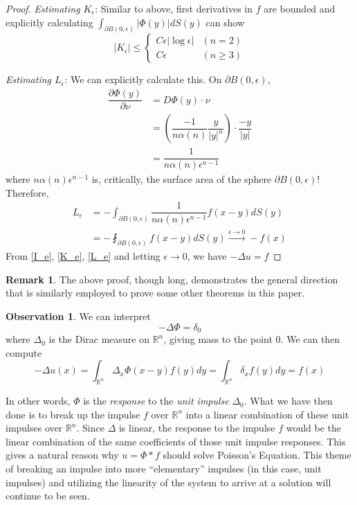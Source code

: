 \documentclass[openany, amssymb, psamsfonts]{amsart}
\theoremstyle{definition}
\newtheorem{rem}{Remark}[section]
\newtheorem{obs}{Observation}[section]
\numberwithin{equation}{section}
\newcommand{\bbr}{\mathbb{R}}
\begin{document}
\begin{proof}
\textit{Estimating $K_\epsilon$}: Similar to above, first derivatives in $f$ are bounded and explicitly calculating $\int_{\partial B(0, \epsilon)} |\Phi (y)| dS(y)$ can show \begin{equation} \label{K_e}
    |K_\epsilon| \leq \begin{cases}
        C\epsilon |\log \epsilon| & (n=2) \\
        C \epsilon & (n \geq 3)
    \end{cases}
\end{equation}

\textit{Estimating $L_\epsilon$}: We can explicitly calculate this. On $\partial B(0, \epsilon)$, \begin{align*}
    \dfrac{\partial \Phi (y)}{\partial \nu} &= D\Phi(y) \cdot \nu \\
    &= \left( \dfrac{-1}{n \alpha(n)} \dfrac{y}{|y|^n} \right) \cdot \dfrac{-y}{|y|} \\
    &= \dfrac{1}{n \alpha(n) \epsilon^{n-1}}
\end{align*}
where $n \alpha(n) \epsilon^{n-1}$ is, critically, the surface area of the sphere $\partial B(0, \epsilon)$! Therefore, 
\begin{align} 
    L_\epsilon &= - \int_{\partial B(0, \epsilon)} \dfrac{1}{n \alpha(n) \epsilon^{n-1}} f(x - y) dS(y) \nonumber \\
    &= - \fint_{\partial B(0, \epsilon)} f(x-y) dS(y) \xrightarrow{\epsilon \to 0} -f(x) \label{L_e}
\end{align}
From \eqref{I_e}, \eqref{K_e}, \eqref{L_e} and letting $\epsilon \to 0$, we have $-\Delta u = f$
\end{proof}

\begin{rem}
    The above proof, though long, demonstrates the general direction that is similarly employed to prove some other theorems in this paper.
\end{rem}

\begin{obs} \label{obs_response}
    We can interpret \begin{equation} \label{impulse_response}
        - \Delta \Phi = \delta_0
    \end{equation}
    where $\Delta_0$ is the Dirac measure on $\bbr^n$, giving mass to the point 0. We can then compute \[
    - \Delta u(x) = \int_{\bbr^n} \Delta_x \Phi(x-y) f(y) dy = \int_{\bbr^n} \delta_x f(y) dy = f(x)
    \]

    In other words, $\Phi$ is the \textit{response} to the \textit{unit impulse} $\Delta_0$. What we have then done is to break up the impulse $f$ over $\bbr^n$ into a linear combination of these unit impulses over $\bbr^n$. Since $\Delta$ is linear, the response to the impulse $f$ would be the linear combination of the same coefficients of those unit impulse responses. This gives a natural reason why $u = \Phi * f$ should solve Poisson's Equation. This theme of breaking an impulse into more ``elementary'' impulses (in this case, unit impulses) and utilizing the linearity of the system to arrive at a solution will continue to be seen.
\end{obs}
\end{document}
